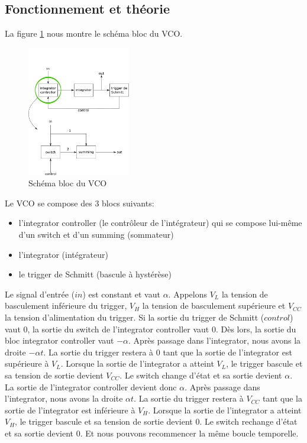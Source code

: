 
\subsection{Fonctionnement et théorie}
La figure \ref{fig:schema_bloc_vco} nous montre le schéma bloc du VCO.
\begin{figure}[ht]
	\centering
	\includegraphics[width=0.4\textwidth]{img/schema_bloc_vco.png}
	\caption{Schéma bloc du VCO}
	\label{fig:schema_bloc_vco}
\end{figure}
Le VCO se compose des 3 blocs suivants:
\begin{itemize}
\item l'integrator controller (le contrôleur de l'intégrateur) qui se compose lui-même d'un switch et d'un summing (sommateur)
\item l'integrator (intégrateur)
\item le trigger de Schmitt (bascule à hystérèse)
\end{itemize}

Le signal d'entrée ($in$) est constant et vaut $\alpha$. Appelons $V_L$ la tension de basculement inférieure du trigger, $V_H$ la tension de basculement supérieure et $V_{CC}$ la tension d'alimentation du trigger.
Si la sortie du trigger de Schmitt ($control$) vaut $0$, la sortie du switch de l'integrator controller vaut $0$. Dès lors, la sortie du bloc integrator controller vaut $-\alpha$.  Après passage dans l'integrator, nous avons la droite $-\alpha t$. La sortie du trigger restera à $0$ tant que la sortie de l'integrator est supérieure à $V_L$. Lorsque la sortie de l'integrator a atteint $V_L$, le trigger bascule et sa tension de sortie devient $V_{CC}$. Le switch change d'état et sa sortie devient $\alpha$. La sortie de l'integrator controller devient donc $\alpha$. Après passage dans l'integrator, nous avons la droite $\alpha t$. La sortie du trigger restera à $V_{CC}$ tant que la sortie de l'integrator est inférieure à $V_H$. Lorsque la sortie de l'integrator a atteint $V_H$, le trigger bascule et sa tension de sortie devient $0$. Le switch rechange d'état et sa sortie devient $0$. Et nous pouvons recommencer la même boucle temporelle.

